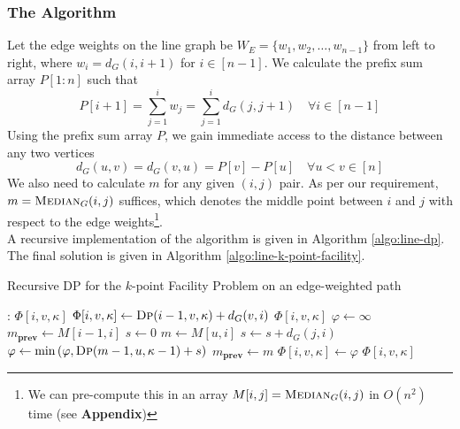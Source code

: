 \documentclass[9pt]{article}
\begin{document}
\subsubsection*{The Algorithm}
Let the edge weights on the line graph be $W_{E} = \{ w_{1}, w_{2}, \ldots, w_{n-1} \}$ from
left to right, where $w_{i} = d_{G}(i, i+1)$ for $i \in [n-1]$. We calculate the prefix sum
array $P[1:n]$ such that
\begin{equation}
    P[i+1] = \sum_{j=1}^{i} w_{j} = \sum_{j=1}^{i} d_{G}(j, j+1) \quad \forall i \in [n-1]
\end{equation}
\vfill
\pagebreak
\hspace*{-19pt}
Using the prefix sum array $P$, we gain immediate access to the distance between any two
vertices
\begin{equation}
    d_{G}(u, v) = d_{G}(v, u) = P[v] - P[u] \quad \forall u < v \in [n]
\end{equation}
We also need to calculate $m$ for any given $(i, j)$ pair. As per our requirement,
$m = \textsc{Median}_{G}(i, j)$ suffices, which denotes the middle point between $i$ and
$j$ with respect to the edge weights\footnote{We can pre-compute this in an array
$M[i, j] = \textsc{Median}_{G}(i, j)$ in $O(n^{2})$ time (see \textbf{Appendix})}. \\
A recursive implementation of the algorithm is given in Algorithm \ref{algo:line-dp}. The final
solution is given in Algorithm \ref{algo:line-k-point-facility}.
\begin{algorithm}[H]
    \caption{Recursive DP for the $k$-point Facility Problem on an edge-weighted path}
    \label{algo:line-dp}
    \begin{algorithmic}[1]
        :
             
                \State \Return $\Phi[i, v, \kappa]$
             
                \State $\Phi[i, v, \kappa] \gets \Call{Dp}{i-1, v, \kappa} + d_{G}(v, i)$
                \State \Return $\Phi[i, v, \kappa]$
            \Else {}
                \State $\varphi \gets \infty$
                \State $m_{\textbf{prev}} \gets M[i-1, i]$
                \State $s \gets 0$
                    \State $m \gets M[u, i]$
                        \State $s \gets s + d_{G}(j, i)$
                    \EndFor
                    \State $\varphi \gets \min \left( \varphi, \Call{Dp}{m-1, u, \kappa-1} + s \right)$
                    \State $m_{\textbf{prev}} \gets m$
                \EndFor
                \State $\Phi[i, v, \kappa] \gets \varphi$
                \State \Return $\Phi[i, v, \kappa]$
            \EndIf
        \EndProcedure
    \end{algorithmic}
\end{algorithm}
\end{document}

